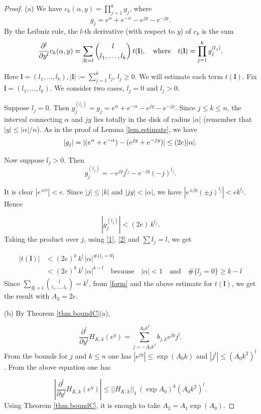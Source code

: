 \documentclass{amsart}
\theoremstyle{definition}
\def\printname#1{
    \if\draft y
        \smash{\makebox[0pt]{\hspace{-0.5in}
            \raisebox{8pt}{\tt\tiny #1}}}
    \fi
}
\def\lbl#1{\label{#1}\printname{#1}}
\def\a{\alpha}
\def\al{\alpha}
\begin{document}
\begin{proof}
(a) We have $c_k(\a,y) = \prod_{j=1}^k g_j$, where
$$
g_j = e^\a + e^{-\a} -e^{jy} - e^{-jy}.
$$
\newcommand{\bl}{{\mathbf l}}
By the Leibniz rule, the $l$-th derivative (with
respect to $y$) of $c_k$ is the sum
\begin{equation}
\lbl{form}
\frac{\partial^l}{\partial y^l} c_k(\a,y) = \sum_{|\bl|=l} \binom {l}{l_1,\dots,l_k}\, t(\bl),
\quad \text{where} \quad
t(\bl)=\prod_{j=1}^k g_j^{(l_j)}.
\end{equation}

Here $\bl=(l_1,\dots,l_k), |\bl|:= \sum_{j=1}^k l_j$, $l_j \ge 0$.
 We will estimate each term $t(\bl)$. Fix $\bl= (l_1,\dots,l_k)$. We
consider two cases, $l_j=0$ and $l_j>0 $.

Suppose $l_j=0$. Then $g_j^{(l_j)} = g_j = e^\a + e^{-\a} - e^{jy}
- e^{-jy}$. Since $j \le k \le n$, the interval connecting $\a$ and
$jy$ lies totally in the disk of radius $|\a|$ (remember that $|y|
\le |\a|/n$). As in the proof of Lemma \ref{lem.estimate}, we have
\begin{equation}
\lbl{1}
|g_j|=|(e^{\a} + e^{-\a}) - (e^{jy} + e^{-jy})| \le (2e)|\a|.
\end{equation}




Now suppose $l_j >0$. Then
$$
g_j^{(l_j)} =  - e^{jy}j^{l_j} - e^{-jy}(-j)^{l_j}.$$

It is clear $|e^{\pm \a}| < e$. Since $|j|\le |k|$ and $|jy| < |\a|$,
we have $|e^{\pm jy}(\pm j)^{l_j}| < e k^{l_j}$. Hence

\begin{equation}
\left |g_j^{(l_j)}\right| <  (2e)\, k^{l_j}.
\label{2}
\end{equation}
Taking the product over $j$, using \eqref{1}, \eqref{2} and $\sum l_j =l$,
we get

$$
\begin{aligned} |t(\bl)| & < (2e)^k\,  k^l\,  |\a|^{\#\{l_j =0 \}} \\
        & < (2e)^k\,  k^l\,  |\a|^{k-l} \quad
\text{because} \quad |\al| <1 \quad \text{and} \quad \#\{l_j =0 \} \ge k-l
\end{aligned}
$$
Since $\sum_{|\bl|=l} \binom {l}{l_1,\dots,l_k} =k^l$, from \eqref{form}  and the above estimate for $t(\bl)$, we get the result with
$A_3=2e$.

(b) By Theorem \ref{thm.boundC}(a),

$$
\frac{\partial^l}{\partial y^l}H_{K,k}(e^{y}) =
\sum_{j=-A_0k^2}^{A_0k^2} b_{j,k} e^{jy} j^l.
$$
From the bounds for $j$ and $k\le n$  one has $ |e^{jy}| \le \exp
(A_0 k )$ and $|j^l | \leq (A_0k^2)^l$. From the above equation one has

$$
\left| \frac{\partial^l}{\partial y^l} H_{K,k}(e^{y})\right| \le ||H_{K,k}||_1
\, (\exp A_0)^k (A_0k^2)^l.
$$
Using Theorem \ref{thm.boundC}, it is enough to take $A_2 = A_1
\exp(A_0)$.
\end{proof}
\end{document}
